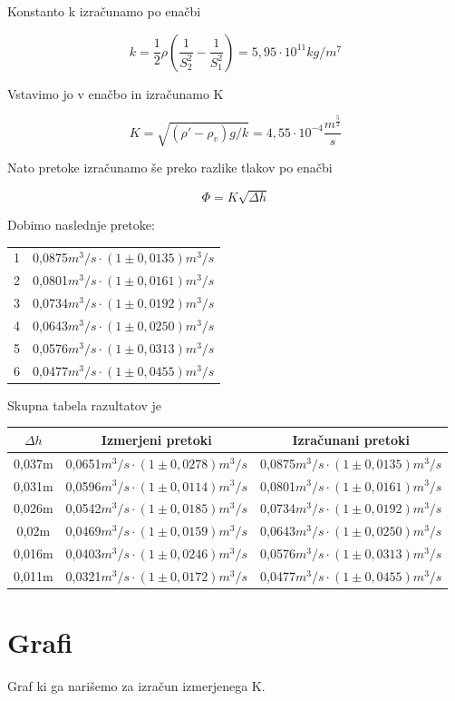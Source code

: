\documentclass[a4paper]{report}
\begin{document}
Konstanto k izračunamo po enačbi

\[k=\frac{1}{2}\rho\left(\frac{1}{S_2^2}-\frac{1}{S_1^2}\right)=5,95\cdot 10^{11}kg/m^7\]

Vstavimo jo v enačbo in izračunamo K

\[K=\sqrt{(\rho'-\rho_v)g/k}=4,55 \cdot 10^{-4}\frac{m^{\frac{5}{2}}}{s}\]

Nato pretoke izračunamo še preko razlike tlakov po enačbi

\[\Phi=K\sqrt{\Delta h}\]

Dobimo naslednje pretoke:
\begin{center}
\begin{tabular}{ |c|c| } 
 \hline
 1&0,0875$m^3/s\cdot(1\pm 0,0135)m^3/s$\\
 2&0,0801$m^3/s\cdot(1\pm 0,0161)m^3/s$\\
 3&0,0734$m^3/s\cdot(1\pm 0,0192)m^3/s$\\
 4&0,0643$m^3/s\cdot(1\pm 0,0250)m^3/s$\\
 5&0,0576$m^3/s\cdot(1\pm 0,0313)m^3/s$\\
 6&0,0477$m^3/s\cdot(1\pm 0,0455)m^3/s$\\
 \hline
\end{tabular}
\end{center}


Skupna tabela razultatov je
\begin{center}
\begin{tabular}{ |c|c|c| } 
 \hline
 $\Delta h$ & Izmerjeni pretoki & Izračunani pretoki\\
 \hline
 0,037m & 0,0651$m^3/s\cdot(1\pm 0,0278)m^3/s$ & 0,0875$m^3/s\cdot(1\pm 0,0135)m^3/s$\\
 0,031m & 0,0596$m^3/s\cdot(1\pm 0,0114)m^3/s$ & 0,0801$m^3/s\cdot(1\pm 0,0161)m^3/s$\\
 0,026m & 0,0542$m^3/s\cdot(1\pm 0,0185)m^3/s$ & 0,0734$m^3/s\cdot(1\pm 0,0192)m^3/s$\\
 0,02m & 0,0469$m^3/s\cdot(1\pm 0,0159)m^3/s$ & 0,0643$m^3/s\cdot(1\pm 0,0250)m^3/s$\\
 0,016m & 0,0403$m^3/s\cdot(1\pm 0,0246)m^3/s$ & 0,0576$m^3/s\cdot(1\pm 0,0313)m^3/s$\\
 0,011m & 0,0321$m^3/s\cdot(1\pm 0,0172)m^3/s$ & 0,0477$m^3/s\cdot(1\pm 0,0455)m^3/s$\\
 \hline
\end{tabular}
\end{center}

\chapter*{Grafi}
Graf ki ga narišemo za izračun izmerjenega K.\\
\end{document}
